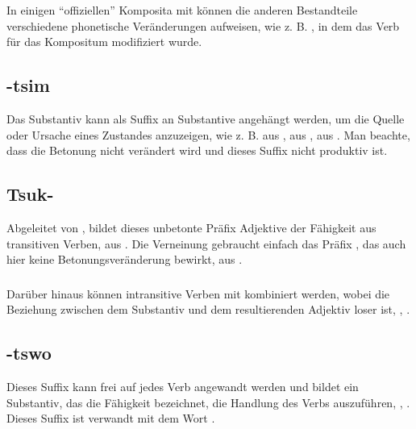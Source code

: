 In einigen ``offiziellen'' Komposita mit  können die anderen Bestandteile verschiedene phonetische Veränderungen aufweisen, wie z. B.  , in dem das Verb  für das Kompositum modifiziert wurde.

\subsection{-tsim} Das Substantiv   kann als Suffix an Substantive angehängt werden, um die Quelle oder Ursache eines Zustandes anzuzeigen, wie z. B.   aus  ,   aus  ,   aus  . Man beachte, dass die Betonung nicht verändert wird und dieses Suffix nicht produktiv ist.

\subsection{Tsuk-} Abgeleitet von , bildet dieses unbetonte Präfix Adjektive der Fähigkeit aus transitiven Verben,   aus  . Die Verneinung gebraucht einfach das Präfix , das auch hier keine Betonungsveränderung bewirkt,   aus  .

\subsubsection{} Darüber hinaus können intransitive Verben mit  kombiniert werden, wobei die Beziehung zwischen dem Substantiv und dem resultierenden Adjektiv loser ist,  ,  .

\subsection{-tswo} Dieses Suffix kann frei auf jedes Verb angewandt werden und bildet ein Substantiv, das die Fähigkeit bezeichnet, die Handlung des Verbs auszuführen,  ,  . Dieses Suffix ist verwandt mit dem Wort  .

